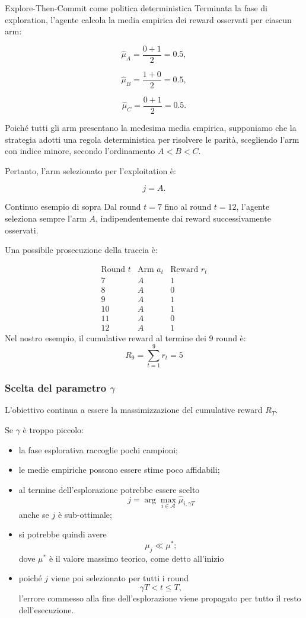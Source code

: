\begin{example}{Explore-Then-Commit come politica deterministica}
Terminata la fase di exploration, l'agente calcola
la media empirica dei reward osservati per ciascun arm:

\[
\hat{\mu}_A=\frac{0+1}{2}=0.5,
\]

\[
\hat{\mu}_B=\frac{1+0}{2}=0.5,
\]

\[
\hat{\mu}_C=\frac{0+1}{2}=0.5.
\]

Poiché tutti gli arm presentano la medesima
media empirica, supponiamo che la strategia
adotti una regola deterministica per risolvere
le parità, scegliendo l'arm con indice minore,
secondo l'ordinamento $A<B<C$.

Pertanto, l'arm selezionato per l'exploitation è:

\[
j=A.
\]
\end{example}
\begin{example}{Continuo esempio di sopra}
Dal round $t=7$ fino al round $t=12$,
l'agente seleziona sempre l'arm $A$,
indipendentemente dai reward successivamente osservati.

Una possibile prosecuzione della traccia è:

\[
\begin{array}{c|c|c}
\text{Round }t & \text{Arm }a_t & \text{Reward }r_t\\
\hline
7 & A & 1\\
8 & A & 0\\
9 & A & 1\\
10 & A & 1\\
11 & A & 0\\
12 & A & 1
\end{array}
\]
Nel nostro esempio, il cumulative reward al termine dei 9 round è:
\[
R_9=\sum_{t=1}^{9}r_t=5
\]
\end{example}


\newpage

\subsubsection{Scelta del parametro $\gamma$}

L'obiettivo continua a essere la massimizzazione del cumulative reward $R_T$.

Se $\gamma$ è troppo piccolo:
\begin{itemize}
    \item la fase esplorativa raccoglie pochi campioni;
    \item le medie empiriche possono essere stime poco affidabili;
    \item al termine dell'esplorazione potrebbe essere scelto
    \[
    j=
    \arg\max_{i\in\mathcal{A}}
    \widehat{\mu}_{i,\gamma T}
    \]
    anche se $j$ è sub-ottimale;
    \item si potrebbe quindi avere
    \[
    \mu_j\ll\mu^*;
    \]
    dove $\mu^*$ è il valore massimo teorico, come detto all'inizio
    \item poiché $j$ viene poi selezionato per tutti i round
    \[
    \gamma T<t\leq T,
    \]
    l'errore commesso alla fine dell'esplorazione viene propagato per tutto il resto dell'esecuzione.
\end{itemize}


